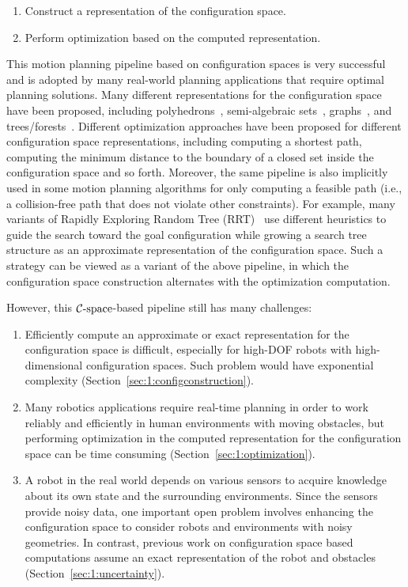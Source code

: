\begin{enumerate}
\item Construct a representation of the configuration space.
\item Perform optimization based on the computed representation.
\end{enumerate}

This motion planning pipeline based on configuration spaces is very successful and is adopted by many real-world planning applications that require optimal planning solutions. Many different representations for the configuration space have been proposed, including polyhedrons~\cite{Chazelle:ADS:1987}, semi-algebraic sets~\cite{Canny:1988:AGC,Canny:1988:CKP}, graphs~\cite{Kavraki96}, and trees/forests~\cite{Kuffner00}. Different optimization approaches have been proposed for different configuration space representations, including computing a shortest path, computing the minimum distance to the boundary of a closed set inside the configuration space and so forth. Moreover, the same pipeline is also implicitly used in some motion planning algorithms for only computing a feasible path (i.e., a collision-free path that does not violate other constraints). For example, many variants of Rapidly Exploring Random Tree (RRT)~\cite{Kuffner00} use different heuristics to guide the search toward the goal configuration while growing a search tree structure as an approximate representation of the configuration space. Such a strategy can be viewed as a variant of the above pipeline, in which the configuration space construction alternates with the optimization computation.


However, this $\mathcal C\text{-space}$-based pipeline still has many challenges:
\begin{enumerate}
\item Efficiently compute an approximate or exact representation for the configuration space is difficult, especially for high-DOF robots with high-dimensional configuration spaces. Such problem would have exponential complexity (Section~\ref{sec:1:configconstruction}).
\item Many robotics applications require real-time planning in order to work reliably and efficiently in human environments with moving obstacles, but performing optimization in the computed representation for the configuration space can be time consuming (Section~\ref{sec:1:optimization}).
\item A robot in the real world depends on various sensors to acquire knowledge about its own state and the surrounding environments. Since the sensors provide noisy data, one important open problem involves enhancing the configuration space to consider robots and environments with noisy geometries. In contrast, previous work on configuration space based computations assume an exact representation of the robot and obstacles (Section~\ref{sec:1:uncertainty}).
\end{enumerate}


